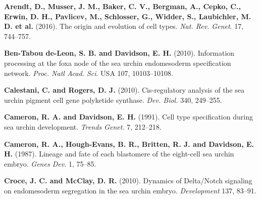 \documentclass[vruler,JEB]{COB}%
\begin{document}







\begin{thebibliography}{}

\textbf{Arendt, D., Musser, J. M., Baker, C. V., Bergman, A., Cepko, C., Erwin, D. H.,
Pavlicev, M., Schlosser, G., Widder, S., Laubichler, M. D. et al.} (2016). The
origin and evolution of cell types. \textit{Nat. Rev. Genet}. 17, 744--757.

\textbf{Ben-Tabou de-Leon, S. B. and Davidson, E. H.} (2010). Information processing at
the foxa node of the sea urchin endomesoderm specification network. \textit{Proc. Natl
Acad. Sci}. USA 107, 10103--10108.

\textbf{Calestani, C. and Rogers, D. J.} (2010). Cis-regulatory analysis of the sea urchin
pigment cell gene polyketide synthase. \textit{Dev. Biol.} 340, 249--255.

\textbf{Cameron, R. A. and Davidson, E. H.} (1991). Cell type specification during sea
urchin development. \textit{Trends Genet.} 7, 212--218.

\textbf{Cameron, R. A., Hough-Evans, B. R., Britten, R. J. and Davidson, E. H.} (1987).
Lineage and fate of each blastomere of the eight-cell sea urchin embryo. \textit{Genes
Dev.} 1, 75--85.

\textbf{Croce, J. C. and McClay, D. R.} (2010). Dynamics of Delta/Notch signaling on
endomesoderm segregation in the sea urchin embryo. \textit{Development} 137, 83--91.

\end{thebibliography}
\end{document}
